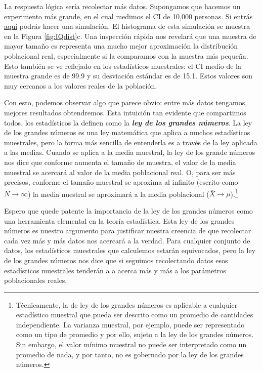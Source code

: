 \documentclass[spanish,]{book}
\let\rmarkdownfootnote\footnote%
\def\footnote{\protect\rmarkdownfootnote}
\begin{document}
La respuesta lógica sería recolectar más datos. Supongamos que hacemos
un experimento más grande, en el cual medimos el CI de 10,000 personas.
Si entrás \href{https://leudave.shinyapps.io/sampling/}{aquí} podrás
hacer una simulación. El histograma de esta simulación se muestra en la
Figura \ref{fig:IQdist}c. Una inspección rápida nos revelará que una
muestra de mayor tamaño es representa una mucho mejor aproximación la
distribución poblacional real, especialmente si la comparamos con la
muestra más pequeña. Esto también se ve reflejado en los estadísticos
muestrales: el CI medio de la muestra grande es de 99.9 y su desviación
estándar es de 15.1. Estos valores son muy cercanos a los valores reales
de la población.

Con esto, podemos observar algo que parece obvio: entre más datos
tengamos, mejores resultados obtendremos. Esta intuición tan evidente
que compartimos todos, los estadísticos la definen como la
\textbf{\emph{ley de los grandes números}}. La ley de los grandes
números es una ley matemática que aplica a muchos estadísticos
muestrales, pero la forma más sencilla de entenderla es a través de la
ley aplicada a las medias. Cuando se aplica a la media muestral, la ley
de los grande números nos dice que conforme aumenta el tamaño de
muestra, el valor de la media muestral se acercará al valor de la media
poblacional real. O, para ser más precisos, conforme el tamaño muestral
se aproxima al infinito (escrito como \(N \rightarrow \infty\)) la media
nuestral se aproximará a la media poblacional
(\(\bar{X} \rightarrow \mu\)).\footnote{Técnicamente, la de ley de los
  grandes números es aplicable a cualquier estadístico muestral que
  pueda ser descrito como un promedio de cantidades independiente. La
  varianza muestral, por ejemplo, puede ser representado como un tipo de
  promedio y por ello, sujeto a la ley de los grandes números. Sin
  embargo, el valor mínimo muestral no puede ser interpretado como un
  promedio de nada, y por tanto, no es gobernado por la ley de los
  grandes números.}

Espero que quede patente la importancia de la ley de los grandes números
como una herramienta elemental en la teoría estadística. Esta ley de los
grandes números es nuestro argumento para justificar nuestra creencia de
que recolectar cada vez más y más datos nos acercará a la verdad. Para
cualquier conjunto de datos, los estadísticos muestrales que calculemos
estarán equivocados, pero la ley de los grandes números nos dice que si
seguimos recolectando datos esos estadísticos muestrales tenderán a a
acerca más y más a los parámetros poblacionales reales.
\end{document}
